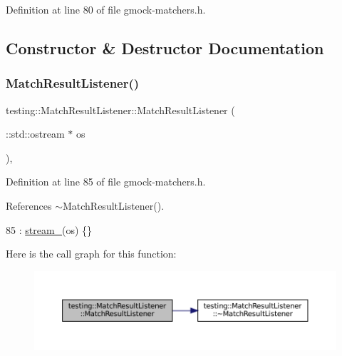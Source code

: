 Definition at line 80 of file gmock-\/matchers.\+h.



\subsection{Constructor \& Destructor Documentation}
\mbox{\label{classtesting_1_1MatchResultListener_a245c360286cd0496d22a4d2fde80eb0b}} 
\subsubsection{\texorpdfstring{Match\+Result\+Listener()}{MatchResultListener()}}
{\footnotesize\ttfamily testing\+::\+Match\+Result\+Listener\+::\+Match\+Result\+Listener (\begin{DoxyParamCaption}\item[{\+::std\+::ostream $\ast$}]{os }\end{DoxyParamCaption})\hspace{0.3cm}{\ttfamily [inline]}, {\ttfamily [explicit]}}



Definition at line 85 of file gmock-\/matchers.\+h.



References $\sim$\+Match\+Result\+Listener().


\begin{DoxyCode}
85 : \hyperlink{classtesting_1_1MatchResultListener_a91ff831a7e848af58d44eb3b1801812c}{stream\_}(os) \{\}
\end{DoxyCode}
Here is the call graph for this function\+:
\nopagebreak
\begin{figure}[H]
\begin{center}
\leavevmode
\includegraphics[width=350pt]{classtesting_1_1MatchResultListener_a245c360286cd0496d22a4d2fde80eb0b_cgraph}
\end{center}
\end{figure}
\mbox{\label{classtesting_1_1MatchResultListener_aa29f43f7b2ffd850c721a8a33ccbba92}} 
